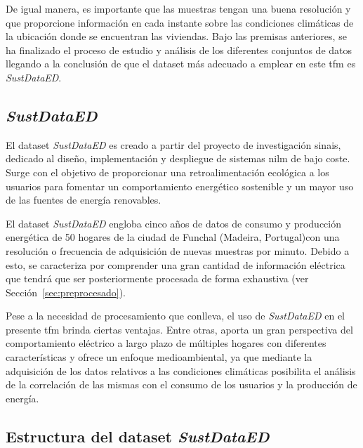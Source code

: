 \vspace{3mm}

De igual manera, es importante que las muestras tengan una buena resolución y que proporcione información en cada instante sobre las condiciones climáticas de la ubicación donde se encuentran las viviendas. Bajo las premisas anteriores, se ha finalizado el proceso de estudio y análisis de los diferentes conjuntos de datos llegando a la conclusión de que el dataset más adecuado a emplear en este \gls{tfm} es \textit{SustDataED}.

\clearpage

\subsection{\textit{SustDataED}}
\label{sec:sustdataed}

El dataset \textit{SustDataED} \cite{sustdata} es creado a partir del proyecto de investigación \gls{sinais}, dedicado al diseño, implementación y despliegue de sistemas \gls{nilm} de bajo coste. Surge con el objetivo de proporcionar una retroalimentación ecológica a los usuarios para fomentar un comportamiento energético sostenible y un mayor uso de las fuentes de energía renovables.

\vspace{3mm}

El dataset \textit{SustDataED} engloba cinco años de datos de consumo y producción energética de 50 hogares de la ciudad de Funchal (Madeira, Portugal)con una resolución o frecuencia de adquisición de nuevas muestras por minuto. Debido a esto, se caracteriza por comprender una gran cantidad de información eléctrica que tendrá que ser posteriormente procesada de forma exhaustiva (ver Sección~\ref{sec:preprocesado}).

\vspace{3mm}

Pese a la necesidad de procesamiento que conlleva, el uso de \textit{SustDataED} en el presente \gls{tfm} brinda ciertas ventajas. Entre otras, aporta un gran perspectiva del comportamiento eléctrico a largo plazo de múltiples hogares con diferentes características y ofrece un enfoque medioambiental, ya que mediante la adquisición de los datos relativos a las condiciones climáticas posibilita el análisis de la correlación de las mismas con el consumo de los usuarios y la producción de energía.

\subsection{Estructura del dataset \textit{SustDataED}}

